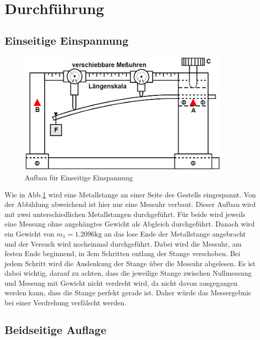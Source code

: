 \section{Durchführung}
\label{sec:Durchführung}

\subsection{Einseitige Einspannung}
\begin{figure}
    \centering
    \includegraphics[height=6cm]{data/bild_3}
    \caption{Aufbau für Einseitige Einspannung}
    \label{fig:aufbau1}
\end{figure}

Wie in Abb.\ref{fig:aufbau1} wird eine Metallstange an einer Seite des Gestells eingespannt. Von der Abbildung abweichend ist hier nur eine Messuhr
verbaut. Dieser Aufbau wird mit zwei unterschiedlichen Metallstangen durchgeführt. Für beide wird jeweils eine Messung ohne angehängtes
Gewicht als Abgleich durchgeführt. Danach wird ein Gewicht von  $m_1 = 1.2096\si{\kilo\gram}$ an das lose Ende der Metallstange angebracht und 
der Versuch wird nocheinmal durchgeführt. Dabei wird die Messuhr, am festen Ende beginnend, in 3$\si{\centi\meter}$ Schritten entlang der 
Stange verschoben. Bei jedem Schritt wird die Auslenkung der Stange über die Messuhr abgelesen. Es ist dabei wichtig, darauf zu achten,
dass die jeweilige Stange zwischen Nullmessung und Messung mit Gewicht nicht verdreht wird, da nicht davon ausgegangen werden kann, dass 
die Stange perfekt gerade ist. Daher würde das Messergebnis bei einer Verdrehung verfälscht werden. 

\subsection{Beidseitige Auflage}

